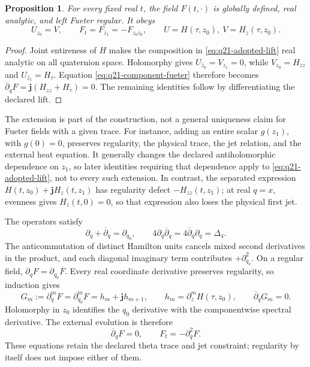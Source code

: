 \documentclass[11pt]{article}
\numberwithin{equation}{section}
\newtheorem{proposition}[theorem]{Proposition}
\theoremstyle{definition}
\theoremstyle{remark}
\begin{document}
\begin{proposition}
\label{prop:q21-regular-lift}
For every fixed real \(t\), the field \(F(t,\cdot)\) is globally
defined, real analytic, and left Fueter regular. It obeys
\[
 U_{z_0}=V,\qquad
 F_t=F_{\bar z_1}=-F_{z_0z_0},
 \qquad U=H(\tau,z_0),\ V=H_z(\tau,z_0).
\]
\end{proposition}
\begin{proof}
Joint entireness of \(H\) makes the composition in
\eqref{eq:q21-adopted-lift} real analytic on all quaternion space.
Holomorphy gives \(U_{\bar z_0}=V_{z_1}=0\), while
\(V_{z_0}=H_{zz}\) and \(U_{\bar z_1}=H_\tau\).
Equation \eqref{eq:q21-component-fueter} therefore becomes
\(\overline\partial_qF=\mathbf j(H_{zz}+H_\tau)=0\).
The remaining identities follow by differentiating the declared lift.
\end{proof}

The extension is part of the construction, not a general uniqueness
claim for Fueter fields with a given trace. For instance, adding an
entire scalar \(g(z_1)\), with \(g(0)=0\), preserves regularity, the
physical trace, the jet relation, and the external heat equation.
It generally changes the declared antiholomorphic dependence on
\(z_1\), so later identities requiring that dependence apply to
\eqref{eq:q21-adopted-lift}, not to every such extension.
In contrast, the separated expression
\(H(t,z_0)+\mathbf jH_z(t,z_1)\) has regularity defect
\(-H_{zz}(t,z_1)\); at real \(q=x\), evenness gives
\(H_z(t,0)=0\), so that expression also loses the physical first jet.

The operators satisfy
\begin{equation}
 \partial_q+\overline\partial_q=\partial_{q_0},
 \qquad
 4\partial_q\overline\partial_q
 =4\overline\partial_q\partial_q=\Delta_4.
 \label{eq:q21-factorization}
\end{equation}
The anticommutation of distinct Hamilton units cancels mixed second
derivatives in the product, and each diagonal imaginary term contributes
\(+\partial_{q_\nu}^2\). On a regular field,
\(\partial_qF=\partial_{q_0}F\).
Every real coordinate derivative preserves regularity, so induction gives
\begin{equation}
 G_m:=\partial_q^mF=\partial_{q_0}^mF
 =h_m+\mathbf jh_{m+1},\qquad
 h_m=\partial_z^mH(\tau,z_0),\qquad
 \overline\partial_qG_m=0.
 \label{eq:q21-regular-jets}
\end{equation}
Holomorphy in \(z_0\) identifies the \(q_0\) derivative with the
componentwise spectral derivative. The external evolution is therefore
\begin{equation}
 \boxed{\overline\partial_qF=0,\qquad F_t=-\partial_q^2F.}
 \label{eq:q21-quaternion-heat}
\end{equation}
These equations retain the declared theta trace and jet constraint;
regularity by itself does not impose either of them.
\end{document}
